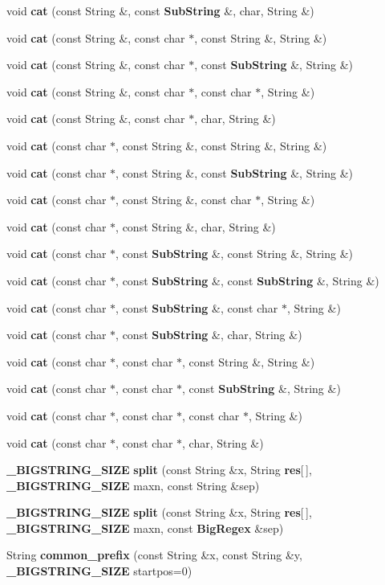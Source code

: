 \begin{CompactItemize}
void {\bf cat} (const String \&, const {\bf Sub\-String} \&, char, String \&)
\item 
void {\bf cat} (const String \&, const char $\ast$, const String \&, String \&)
\item 
void {\bf cat} (const String \&, const char $\ast$, const {\bf Sub\-String} \&, String \&)
\item 
void {\bf cat} (const String \&, const char $\ast$, const char $\ast$, String \&)
\item 
void {\bf cat} (const String \&, const char $\ast$, char, String \&)
\item 
void {\bf cat} (const char $\ast$, const String \&, const String \&, String \&)
\item 
void {\bf cat} (const char $\ast$, const String \&, const {\bf Sub\-String} \&, String \&)
\item 
void {\bf cat} (const char $\ast$, const String \&, const char $\ast$, String \&)
\item 
void {\bf cat} (const char $\ast$, const String \&, char, String \&)
\item 
void {\bf cat} (const char $\ast$, const {\bf Sub\-String} \&, const String \&, String \&)
\item 
void {\bf cat} (const char $\ast$, const {\bf Sub\-String} \&, const {\bf Sub\-String} \&, String \&)
\item 
void {\bf cat} (const char $\ast$, const {\bf Sub\-String} \&, const char $\ast$, String \&)
\item 
void {\bf cat} (const char $\ast$, const {\bf Sub\-String} \&, char, String \&)
\item 
void {\bf cat} (const char $\ast$, const char $\ast$, const String \&, String \&)
\item 
void {\bf cat} (const char $\ast$, const char $\ast$, const {\bf Sub\-String} \&, String \&)
\item 
void {\bf cat} (const char $\ast$, const char $\ast$, const char $\ast$, String \&)
\item 
void {\bf cat} (const char $\ast$, const char $\ast$, char, String \&)
\item 
{\bf \_\-BIGSTRING\_\-SIZE} {\bf split} (const String \&x, String {\bf res}[$\,$], {\bf \_\-BIGSTRING\_\-SIZE} maxn, const String \&sep)
\item 
{\bf \_\-BIGSTRING\_\-SIZE} {\bf split} (const String \&x, String {\bf res}[$\,$], {\bf \_\-BIGSTRING\_\-SIZE} maxn, const {\bf Big\-Regex} \&sep)
\item 
String {\bf common\_\-prefix} (const String \&x, const String \&y, {\bf \_\-BIGSTRING\_\-SIZE} startpos=0)

\end{CompactItemize}
